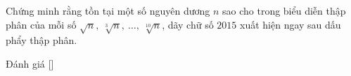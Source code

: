 \ifshowproblem
\begin{problem}\label{problem:RUS-2015-TMO-J-P4}
    Chứng minh rằng tồn tại một số nguyên dương \( n \) sao cho trong biểu diễn thập phân của mỗi số 
    \( \sqrt{n},\ \sqrt[3]{n},\ \ldots,\ \sqrt[10]{n} \), dãy chữ số \(2015\) xuất hiện ngay sau dấu phẩy thập phân.
\end{problem}
\fi

\ifshowinfo
Đánh giá [\textbf{}]\footnotemark
{}
\fi